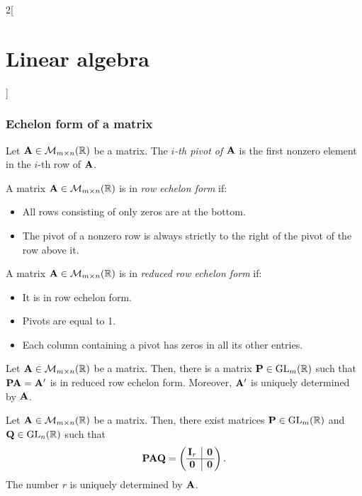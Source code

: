 \documentclass[../../../main.tex]{subfiles}
\begin{document}
\begin{multicols}{2}[\section{Linear algebra}]
\subsubsection*{Echelon form of a matrix}
\begin{definition}
    Let $\vb{A}\in\mathcal{M}_{m\times n}(\mathbb{R})$ be a matrix. The \textit{$i$-th pivot of $\vb{A}$} is the first nonzero element in the $i$-th row of $\vb{A}$.
\end{definition}
\begin{definition}
    A matrix $\vb{A}\in\mathcal{M}_{m\times n}(\mathbb{R})$ is in \textit{row echelon form} if:
    \begin{itemize}
        \item All rows consisting of only zeros are at the bottom.
        \item The pivot of a nonzero row is always strictly to the right of the pivot of the row above it.
    \end{itemize}
\end{definition}
\begin{definition}
    A matrix $\vb{A}\in\mathcal{M}_{m\times n}(\mathbb{R})$ is in \textit{reduced row echelon form} if:
    \begin{itemize}
        \item It is in row echelon form.
        \item Pivots are equal to 1.
        \item Each column containing a pivot has zeros in all its other entries.
    \end{itemize}
\end{definition}
\begin{theorem}
    Let $\vb{A}\in\mathcal{M}_{m\times n}(\mathbb{R})$ be a matrix. Then, there is a matrix $\vb{P}\in\mathrm{GL}_m(\mathbb{R})$ such that $\vb{P}\vb{A}=\vb{A'}$ is in reduced row echelon form. Moreover, $\vb{A'}$ is uniquely determined by $\vb{A}$.
\end{theorem}
\begin{theorem}
    Let $\vb{A}\in\mathcal{M}_{m\times n}(\mathbb{R})$ be a matrix. Then, there exist matrices $\vb{P}\in\mathrm{GL}_m(\mathbb{R})$ and $\vb{Q}\in\mathrm{GL}_n(\mathbb{R})$ such that 
    $$\mathblack{P}\mathblack{A}\mathblack{Q}=\left(
    \begin{array}{@{\,} c|c @{\,}}
        \mathblack{I}_r & \mathblack{0}\\
        \hline
        \mathblack{0} & \mathblack{0}
    \end{array}
    \right).$$
    The number $r$ is uniquely determined by $\vb{A}$.
\end{theorem}

\end{multicols}
\end{document}
